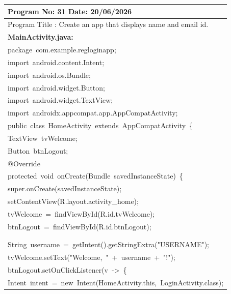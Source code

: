 \documentclass[a4paper,12pt]{article}
\begin{document}
\noindent\begingroup
\renewcommand{\arraystretch}{1.1}
\begin{longtable}{|p{}|}
\hline\endfirsthead\hline\endhead\hline\endfoot\hline\endlastfoot
\rule{0pt}{13pt}Program No: 31 \hfill Date: 20/06/2026 \\
\hline
\rule{0pt}{13pt}Program Title : Create an app that displays name and email id. \\
\hline
\rule{0pt}{13pt}\textbf{MainActivity.java:} \\
\hline
{\ttfamily\small package\ com.example.regloginapp;} \\
{\ttfamily\small import\ android.content.Intent;} \\
{\ttfamily\small import\ android.os.Bundle;} \\
{\ttfamily\small import\ android.widget.Button;} \\
{\ttfamily\small import\ android.widget.TextView;} \\
{\ttfamily\small import\ androidx.appcompat.app.AppCompatActivity;} \\
{\ttfamily\small public\ class\ HomeActivity\ extends\ AppCompatActivity\ \{} \\
{\ttfamily\small TextView\ tvWelcome;} \\
{\ttfamily\small Button\ btnLogout;} \\
{\ttfamily\small @Override} \\
{\ttfamily\small protected\ void\ onCreate(Bundle\ savedInstanceState)\ \{} \\
{\ttfamily\small super.onCreate(savedInstanceState);} \\
{\ttfamily\small setContentView(R.layout.activity\_home);} \\
{\ttfamily\small tvWelcome\ =\ findViewById(R.id.tvWelcome);} \\
{\ttfamily\small btnLogout\ =\ findViewById(R.id.btnLogout);} \\
\strut \\
\strut \\
{\ttfamily\small String\ username\ =\ getIntent().getStringExtra("USERNAME");} \\
{\ttfamily\small tvWelcome.setText("Welcome,\ "\ +\ username\ +\ "!");} \\
{\ttfamily\small btnLogout.setOnClickListener(v\ -\textgreater{}\ \{} \\
{\ttfamily\small Intent\ intent\ =\ new\ Intent(HomeActivity.this,\ LoginActivity.class);} \\

\end{longtable}
\end{document}
